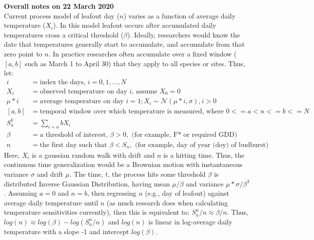 \documentclass[11pt,letter]{article}
\begin{document}
{\bf Overall notes on 22 March 2020} \\ %

Current process model of leafout day ($n$) varies as a function of average daily temperature ($X_i$). In this model leafout occurs after accumulated daily temperatures cross a critical threshold ($\beta$). Ideally, researchers would know the date that temperatures generally start to accumulate, and accumulate from that zero point to $n$. In practice researches often accumulate over a fixed window ($[a, b]$ such as March 1 to April 30) that they apply to all species or sites. Thus, let:
\begin{align*}
i & = \text{index the days, }  i = 0, 1, ..., N\\
X_i & = \text{observed temperature on day $i$, assume } X_0 = 0\\
\mu * i & = \text{average temperature on day } i = 1; X_i \sim \mathcal{N}(\mu * i, \sigma), i > 0\\ %
[a, b] &  = \text{temporal window over which temperature is measured, where } 0 <= a < n <= b <= N\\
S_a^b & = \sum_{i = a}{b}X_i\\ %
\beta & = \text{a threshold of interest, } \beta > 0, \text{ (for example, F* or required GDD)}\\
n &  = \text{the first day such that }  \beta < S_n, \text{ (for example, day of year (doy) of budburst)}
\end{align*} 
Here, $X_i$ is a gaussian random walk with drift and $n$ is a hitting time. Thus, the continuous time generalization would be a Brownian motion with instantaneous variance $\sigma$ and drift $\mu$. The time, $t$, the process hits some threshold $\beta$ is distributed Inverse Gaussian Distribution, having mean $\mu/\beta$ and variance $\mu * \sigma / \beta^3$. Assuming $a=0$ and $n=b$, then regressing $n$ (e.g., day of leafout) against average daily temperature until $n$ (as much research does when calculating temperature sensitivities currently), then this is equivalent to: $S_a^n/n  \approx \beta/n$. Thus, $log(n) \approx log(\beta) - log(S_a^n/n)$ and $log(n)$ is linear in log-average daily temperature with a slope -1 and intercept $log(\beta)$.\\
\end{document}
